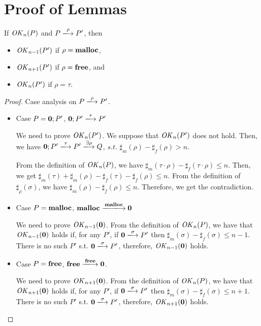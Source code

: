\section{Proof of Lemmas}
\label{sec:proof}

\begin{lemma}
\label{lem:okPreserved}
If \(\mathit{OK}_n(P)\) and \(P \xlongrightarrow{\rho} P'\), then
\begin{itemize}
\item \(\mathit{OK}_{n-1}(P')\) if \(\rho = \mathbf{malloc}\),
\item \(\mathit{OK}_{n+1}(P')\) if \(\rho = \mathbf{free}\), and
\item \(\mathit{OK}_n(P')\) if \(\rho = \tau\).
\end{itemize}
\end{lemma}
\begin{proof}

Case analysis on \(P \xlongrightarrow{\rho} P'\).

\begin{itemize}
\item Case $P = \mathbf{0};P'$, \Rtab \(\TSKIP;P' \xlongrightarrow{\tau} P'\)

  We need to prove \(\mathit{OK}_n(P')\).   We suppose that
  \(\mathit{OK}_n(P')\) does not hold. Then, we have \(\TSKIP;P'
  \xlongrightarrow{\tau} P' \xlongrightarrow{\exists \rho}
  Q\), \(s.t.\) \(\sharp_{m}(\rho) - \sharp_{f}(\rho) > n\).

  From the definition of \(\mathit{OK}_n(P)\), we have \(\sharp_m(\tau \cdot
  \rho) - \sharp_f(\tau \cdot \rho) \le n \). Then, we get
  \(\sharp_m(\tau) + \sharp_m(\rho) - \sharp_f(\tau) - \sharp_f(\rho)
  \le n\). From the definition of \(\sharp_\rho(\sigma)\), we have
  \(\sharp_m(\rho) - \sharp_f(\rho) \le n\). Therefore, we get the
  contradiction.

\item Case $P = \mathbf{malloc}$, \Rtab \(\Malloc
  \xlongrightarrow{\Malloc} \TSKIP\)

  We need to prove \(\mathit{OK}_{n-1}(\mathbf{0})\).  From the definition of
  \(\mathit{OK}_n(P)\), we have that \(\mathit{OK}_{n-1}(\mathbf{0})\) holds if, for any
  \(P'\), if \(\TSKIP \xlongrightarrow{\sigma} P'\) then
  \(\sharp_m(\sigma) - \sharp_f(\sigma) \le n - 1\). There is no such \(P'\) s.t. \(\TSKIP
  \xlongrightarrow{\sigma} P'\), therefore, \(\mathit{OK}_{n-1}(\mathbf{0})\) holds.

  \item Case $P = \mathbf{free}$, \Rtab \(\Free \xlongrightarrow{\Free} \TSKIP\).

    We need to prove \(\mathit{OK}_{n+1}(\mathbf{0})\).  From the definition of
  \(\mathit{OK}_n(P)\), we have that \(\mathit{OK}_{n+1}(\mathbf{0})\) holds if, for any
  \(P'\), if \(\TSKIP \xlongrightarrow{\sigma} P'\) then
  \(\sharp_m(\sigma) - \sharp_f(\sigma) \le n + 1\). There is no such \(P'\) s.t. \(\TSKIP
  \xlongrightarrow{\sigma} P'\), therefore, \(\mathit{OK}_{n+1}(\mathbf{0})\) holds.


\end{itemize}
\end{proof}
